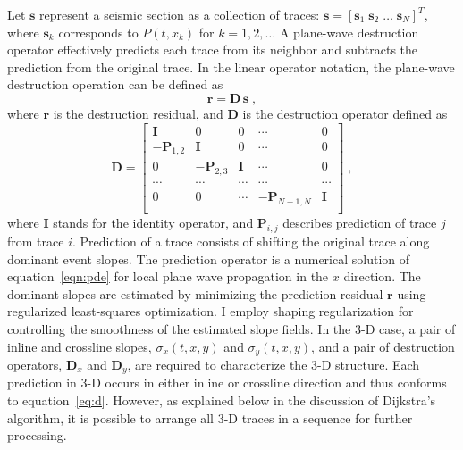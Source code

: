 Let $\mathbf{s}$ represent a seismic section
as a collection of traces: $\mathbf{s} =
\left[\mathbf{s}_1 \; \mathbf{s}_2 \; \ldots \;
\mathbf{s}_N\right]^T$, where $\mathbf{s}_k$ corresponds to $P(t,x_k)$
for $k=1,2,\ldots$ A plane-wave destruction operator
\cite[]{GEO67-06-19461960} effectively predicts each trace from its
neighbor and subtracts the prediction from the original trace.  In the
linear operator notation, the plane-wave destruction operation can be
defined as
\begin{equation}
  \label{eq:pwd}
  \mathbf{r} = \mathbf{D\,s}\;,
\end{equation}
where $\mathbf{r}$ is the destruction residual, and $\mathbf{D}$ is the
destruction operator defined as
\begin{equation}
  \label{eq:d}
  \mathbf{D} = 
  \left[\begin{array}{ccccc}
      \mathbf{I} & 0 & 0 & \cdots & 0 \\
      - \mathbf{P}_{1,2} & \mathbf{I} & 0 & \cdots & 0 \\
      0 & - \mathbf{P}_{2,3} & \mathbf{I} & \cdots & 0 \\
      \cdots & \cdots & \cdots & \cdots & \cdots \\
      0 & 0 & \cdots & - \mathbf{P}_{N-1,N} & \mathbf{I} \\
    \end{array}\right]\;,
\end{equation}
where $\mathbf{I}$ stands for the identity operator, and
$\mathbf{P}_{i,j}$ describes prediction of trace $j$ from trace
$i$. Prediction of a trace consists of shifting the original trace
along dominant event slopes. The prediction operator is a numerical
solution of equation~\ref{eqn:pde} for local plane wave propagation
in the $x$ direction. The dominant slopes are estimated by minimizing
the prediction residual $\mathbf{r}$ using regularized least-squares
optimization. I employ shaping
  regularization \cite[]{shape} for controlling the smoothness of the
  estimated slope fields. In the 3-D case, a pair of inline and
crossline slopes, $\sigma_x(t,x,y)$ and $\sigma_y(t,x,y)$, and a pair
of destruction operators, $\mathbf{D}_x$ and $\mathbf{D}_y$, are
required to characterize the 3-D structure. Each prediction in 3-D occurs in
  either inline or crossline direction and thus conforms to
  equation~\ref{eq:d}. However, as explained below in the discussion
  of Dijkstra's algorithm, it is possible to arrange all 3-D traces
  in a sequence for further processing.

